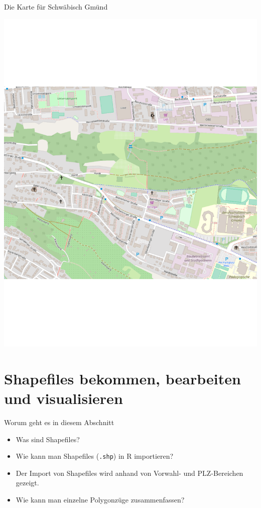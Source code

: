\documentclass[ignorenonframetext,]{beamer}
\providecommand{\tightlist}{%
  \setlength{\itemsep}{0pt}\setlength{\parskip}{0pt}}
\begin{document}
\begin{frame}{Die Karte für Schwäbisch Gmünd}
\protect\hypertarget{die-karte-fur-schwabisch-gmund}{}

\includegraphics{figure/PH_SG.pdf}

\end{frame}

\hypertarget{shapefiles-bekommen-bearbeiten-und-visualisieren}{%
\section{Shapefiles bekommen, bearbeiten und
visualisieren}\label{shapefiles-bekommen-bearbeiten-und-visualisieren}}

\begin{frame}[fragile]{Worum geht es in diesem Abschnitt}
\protect\hypertarget{worum-geht-es-in-diesem-abschnitt}{}

\begin{itemize}
\tightlist
\item
  Was sind Shapefiles?
\item
  Wie kann man Shapefiles (\texttt{.shp}) in R importieren?
\item
  Der Import von Shapefiles wird anhand von Vorwahl- und PLZ-Bereichen
  gezeigt.
\item
  Wie kann man einzelne Polygonzüge zusammenfassen?
\end{itemize}

\end{frame}
\end{document}
